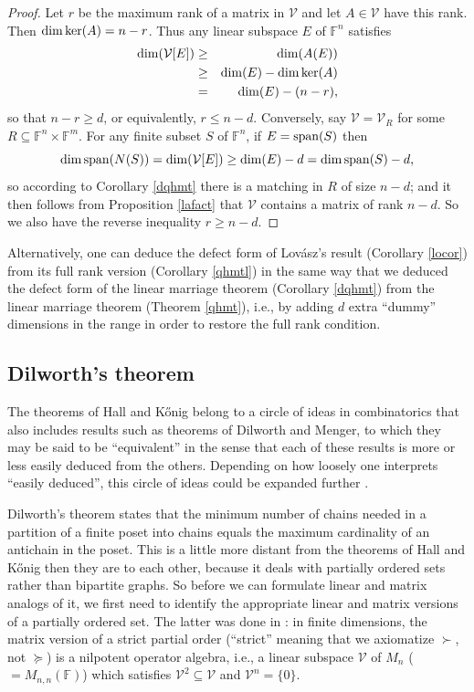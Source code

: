 \documentclass{amsart}
\theoremstyle{definition}
\begin{document}
\begin{proof}
Let $r$ be the maximum rank of a matrix in $\mathcal{V}$ and let $A \in \mathcal{V}$ have this rank. Then ${\rm dim}\, {\rm ker}(A) = n - r$. Thus any linear subspace $E$ of $\mathbb{F}^n$ satisfies
\begin{eqnarray*}
{\rm dim}(\mathcal{V}[E]) &\geq& {\rm dim}(A(E))\\
&\geq& {\rm dim}(E) - {\rm dim}\, {\rm ker}(A)\\
&=& {\rm dim}(E) - (n - r),
\end{eqnarray*}
so that $n - r \geq d$, or equivalently, $r \leq n - d$. Conversely, say $\mathcal{V} = \mathcal{V}_R$ for some $R \subseteq \mathbb{F}^n\times\mathbb{F}^m$. For any finite subset $S$ of $\mathbb{F}^n$, if $E = {\rm span}(S)$ then $${\rm dim}\, {\rm span}(N(S)) = {\rm dim}(\mathcal{V}[E]) \geq {\rm dim}(E) - d = {\rm dim}\, {\rm span}(S) - d,$$ so according to Corollary \ref{dqhmt} there is a matching in $R$ of size $n - d$; and it then follows from Proposition \ref{lafact} that $\mathcal{V}$ contains a matrix of rank $n - d$. So we also have the reverse inequality $r \geq n - d$.
\end{proof}

Alternatively, one can deduce the defect form of Lovász's result (Corollary \ref{locor}) from its full rank version (Corollary \ref{qhmtl}) in the same way that we deduced the defect form of the linear marriage theorem (Corollary \ref{dqhmt}) from the linear marriage theorem (Theorem \ref{qhmt}), i.e., by adding $d$ extra ``dummy'' dimensions in the range in order to restore the full rank condition.

\subsection{Dilworth's theorem}

The theorems of Hall and Kőnig belong to a circle of ideas in combinatorics that also includes results such as theorems of Dilworth and Menger, to which they may be said to be ``equivalent'' in the sense that each of these results is more or less easily deduced from the others. Depending on how loosely one interprets ``easily deduced'', this circle of ideas could be expanded further \cite{cameron}. 

Dilworth's theorem states that the minimum number of chains needed in a partition of a finite poset into chains equals the maximum cardinality of an antichain in the poset. This is a little more distant from the theorems of Hall and Kőnig then they are to each other, because it deals with partially ordered sets rather than bipartite graphs. So before we can formulate linear and matrix analogs of it, we first need to identify the appropriate linear and matrix versions of a partially ordered set. The latter was done in \cite{weaver}: in finite dimensions, the matrix version of a strict partial order (``strict'' meaning that we axiomatize $\succ$, not $\succeq$) is a nilpotent operator algebra, i.e., a linear subspace $\mathcal{V}$ of $M_n$ ($= M_{n,n}(\mathbb{F})$) which satisfies $\mathcal{V}^2 \subseteq \mathcal{V}$ and $\mathcal{V}^n = \{0\}$.
\end{document}
